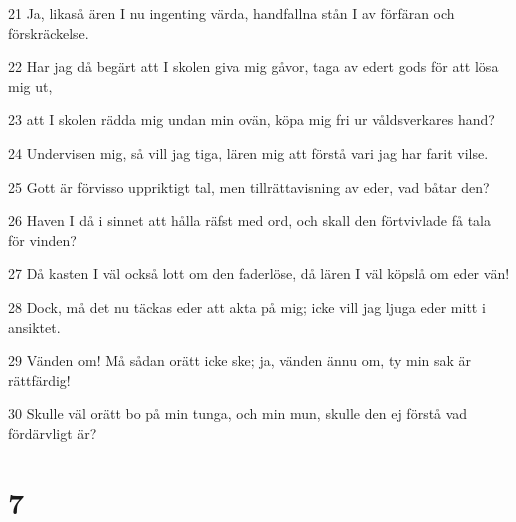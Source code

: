 \par 21 Ja, likaså ären I nu ingenting värda, handfallna stån I av förfäran och förskräckelse.
\par 22 Har jag då begärt att I skolen giva mig gåvor, taga av edert gods för att lösa mig ut,
\par 23 att I skolen rädda mig undan min ovän, köpa mig fri ur våldsverkares hand?
\par 24 Undervisen mig, så vill jag tiga, lären mig att förstå vari jag har farit vilse.
\par 25 Gott är förvisso uppriktigt tal, men tillrättavisning av eder, vad båtar den?
\par 26 Haven I då i sinnet att hålla räfst med ord, och skall den förtvivlade få tala för vinden?
\par 27 Då kasten I väl också lott om den faderlöse, då lären I väl köpslå om eder vän!
\par 28 Dock, må det nu täckas eder att akta på mig; icke vill jag ljuga eder mitt i ansiktet.
\par 29 Vänden om! Må sådan orätt icke ske; ja, vänden ännu om, ty min sak är rättfärdig!
\par 30 Skulle väl orätt bo på min tunga, och min mun, skulle den ej förstå vad fördärvligt är?

\chapter{7}

